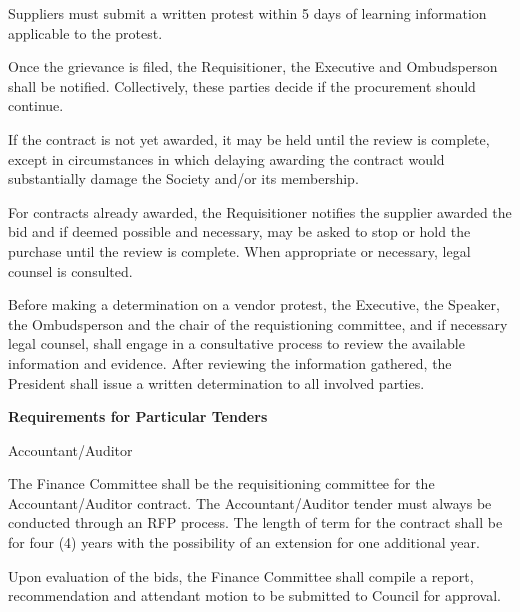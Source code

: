 \begin{longenum}[label*=\thesection.\arabic*., align=left]
\begin{longenum} [label*=\arabic*., align=left]
\item Suppliers must submit a written protest within 5 days of learning information applicable to the protest.

\item Once the grievance is filed, the Requisitioner, the Executive and Ombudsperson shall be notified. Collectively, these parties decide if the procurement should continue. 

\item If the contract is not yet awarded, it may be held until the review is complete, except in circumstances in which delaying awarding the contract would substantially damage the Society and/or its membership. 

\item For contracts already awarded, the Requisitioner notifies the supplier awarded the bid and if deemed possible and necessary, may be asked to stop or hold the purchase until the review is complete. When appropriate or necessary, legal counsel is consulted.

\item Before making a determination on a vendor protest, the Executive, the Speaker, the Ombudsperson and the chair of the requistioning committee, and if necessary legal counsel, shall engage in a consultative process to review the available information and evidence. After reviewing the information gathered, the President shall issue a written determination to all involved parties.
\end{longenum}

\item \textbf{Requirements for Particular Tenders}

\begin{longenum} [label*=\arabic*., align=left]
		\item  Accountant/Auditor
		\begin{longenum} [label*=\arabic*., align=left]
			\item The Finance Committee shall be the requisitioning committee for the Accountant/Auditor contract. The Accountant/Auditor tender must always be conducted through an RFP process. The length of term for the contract shall be for four (4) years with the possibility of an extension for one additional year.
			
			\item Upon evaluation of the bids, the Finance Committee shall compile a report, recommendation and attendant motion to be submitted to Council for approval. 
			

\end{longenum}
\end{longenum}
\end{longenum}

